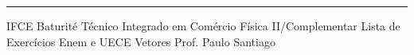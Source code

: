 

\IFCEativosInstitucionais
  {}     %
  {\textcolor{ifcegreen}{\rule{0.3cm}{0.3cm}}}        %

\def\ImagemCapa{\IFCEimagemDummy{17.87cm}{13.0cm}}    %

\IFCEmetadados
  {IFCE Baturité}                          %
  {Técnico Integrado em Comércio}           %
  {Física II/Complementar}                  %
  {Lista de Exercícios}                     %
  {Enem e UECE}                             %
  {Vetores}                                 %
  {Prof. Paulo Santiago}                    %
  {}  %
